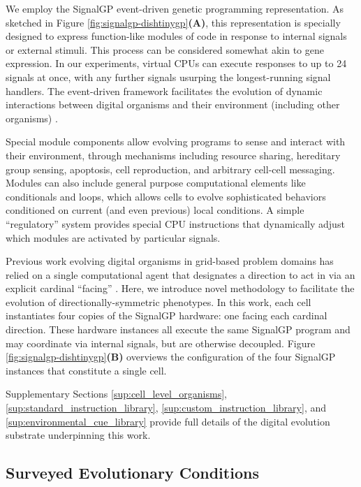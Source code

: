 We employ the SignalGP event-driven genetic programming representation.
As sketched in Figure \ref{fig:signalgp-dishtinygp}\textbf{(A)}, this representation is specially designed to express function-like modules of code in response to internal signals or external stimuli.
This process can be considered somewhat akin to gene expression.
In our experiments, virtual CPUs can execute responses to up to 24 signals at once, with any further signals usurping the longest-running signal handlers.
The event-driven framework facilitates the evolution of dynamic interactions between digital organisms and their environment (including other organisms) \citep{lalejini2018evolving}.

Special module components allow evolving programs to sense and interact with their environment, through mechanisms including resource sharing, hereditary group sensing, apoptosis, cell reproduction, and arbitrary cell-cell messaging.
Modules can also include general purpose computational elements like conditionals and loops, which allows cells to evolve sophisticated behaviors conditioned on current (and even previous) local conditions.
A simple ``regulatory'' system provides special CPU instructions that dynamically adjust which modules are activated by particular signals.

Previous work evolving digital organisms in grid-based problem domains has relied on a single computational agent that designates a direction to act in via an explicit cardinal ``facing'' \citep{goldsby2014evolutionary, goldsby2018serendipitous, grabowski2010early, biswas2014causes, lalejini2018evolving}.
Here, we introduce novel methodology to facilitate the evolution of directionally-symmetric phenotypes.
In this work, each cell instantiates four copies of the SignalGP hardware: one facing each cardinal direction.
These hardware instances all execute the same SignalGP program and may coordinate via internal signals, but are otherwise decoupled.
Figure \ref{fig:signalgp-dishtinygp}\textbf{(B)} overviews the configuration of the four SignalGP instances that constitute a single cell.

Supplementary Sections \ref{sup:cell_level_organisms}, \ref{sup:standard_instruction_library}, \ref{sup:custom_instruction_library}, and \ref{sup:environmental_cue_library} provide full details of the digital evolution substrate underpinning this work.

\subsection{Surveyed Evolutionary Conditions}


